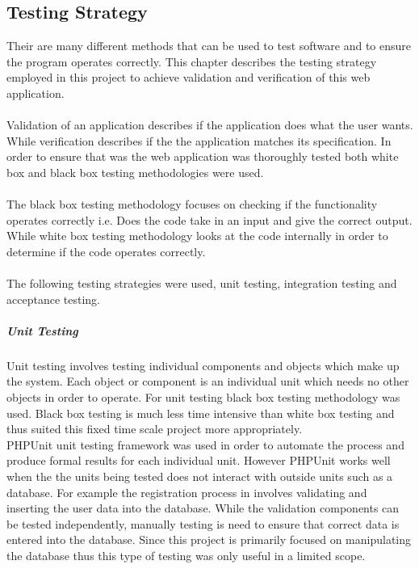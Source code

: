 \documentclass[a4paper,oneside,11pt]{report}
\begin{document}
\subsection{Testing Strategy}
Their are many different methods that can be used to test software and to ensure the program operates correctly. This chapter describes the testing strategy employed in this project to achieve validation and verification of this web application.
\\
\\
Validation of an application describes if the application does what the user wants. While verification describes if the the application matches its specification. In order to ensure that was the web application was thoroughly tested both white box and black box testing methodologies were used.
\\
\\
The black box testing methodology focuses on checking if the functionality operates correctly i.e. Does the code take in an input and give the correct output. While white box testing methodology looks at the code internally in order to determine if the code operates correctly.
\\
\\
The following testing strategies were used, unit testing, integration testing and acceptance testing.
\subparagraph{Unit Testing}
Unit testing involves testing individual components and objects which make up the system. Each object or component is an individual unit which needs no other objects in order to operate. For unit testing black box testing methodology was used. Black box testing is much less time intensive than white box testing and thus suited this fixed time scale project more appropriately.
\\
PHPUnit unit testing framework was used in order to automate the process and produce formal results for each individual unit. However PHPUnit works well when the the units being tested does not interact with outside units such as a database. For example the registration process in involves validating and inserting the user data into the database. While the validation components can be tested independently, manually testing is need to ensure that correct data is entered into the database. Since this project is primarily focused on manipulating the database thus this type of testing was only useful in a limited scope.
\end{document}

